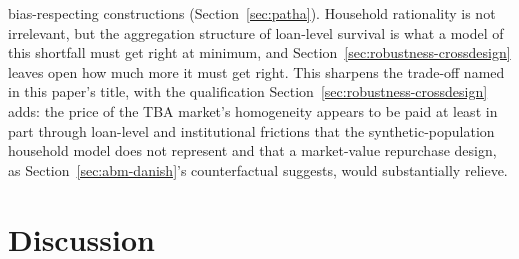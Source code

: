 \documentclass[12pt]{article}
\begin{document}
bias-respecting constructions (Section~\ref{sec:patha}). Household rationality is not irrelevant, but the aggregation structure of loan-level survival is what a model of this shortfall must get right at minimum, and Section~\ref{sec:robustness-crossdesign} leaves open how much more it must get right. This sharpens the trade-off named in this paper's title, with the qualification Section~\ref{sec:robustness-crossdesign} adds: the price of the TBA market's homogeneity appears to be paid at least in part through loan-level and institutional frictions that the synthetic-population household model does not represent and that a market-value repurchase design, as Section~\ref{sec:abm-danish}'s counterfactual suggests, would substantially relieve.

\section{Discussion}\label{sec:discussion}
\end{document}
